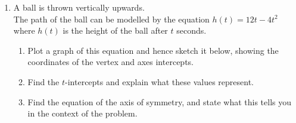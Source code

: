 \documentclass[12pt, twoside]{article}
\begin{document}
\begin{enumerate}
\newpage
\item A ball is thrown vertically upwards.\\[0.25cm]
The path of the ball can be modelled by the equation $h(t)=12t-4t^2$ where $h(t)$ is the height of the ball after $t$ seconds.
    \begin{enumerate}
        \item Plot a graph of this equation and hence sketch it below, showing the coordinates of the vertex and axes intercepts.
        \item Find the $t$-intercepts and explain what these values represent. \vspace{2cm}
        \item Find the equation of the axis of symmetry, and state what this tells you in the context of the problem. \vspace{2cm}
    \end{enumerate}
    \begin{center}
    \end{center}
    

\end{enumerate}
\end{document}
